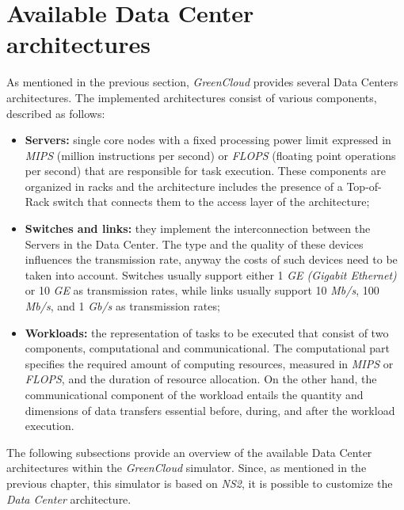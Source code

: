 \section{Available Data Center architectures} \label{chapter:architectures}
As mentioned in the previous section, \emph{GreenCloud} provides several Data Centers architectures. The implemented architectures consist of various components, described as follows:
\begin{itemize}
    \item \textbf{Servers:} single core nodes with a fixed processing power limit expressed in \emph{MIPS} (million instructions per second) or \emph{FLOPS} (floating point operations per second) that are responsible for task execution. These components are organized in racks and the architecture includes the presence of a Top-of-Rack switch that connects them to the access layer of the architecture;
    \item \textbf{Switches and links:} they implement the interconnection between the Servers in the Data Center. The type and the quality of these devices influences the transmission rate, anyway the costs of such devices need to be taken into account. Switches usually support either 1 \emph{GE (Gigabit Ethernet)} or 10 \emph{GE} as transmission rates, while links usually support 10 \emph{Mb/s}, 100 \emph{Mb/s}, and 1 \emph{Gb/s} as transmission rates;
    \item \textbf{Workloads:} the representation of tasks to be executed that consist of two components, computational and communicational. The computational part specifies the required amount of computing resources, measured in \emph{MIPS} or \emph{FLOPS}, and the duration of resource allocation. On the other hand, the communicational component of the workload entails the quantity and dimensions of data transfers essential before, during, and after the workload execution.
\end{itemize}
The following subsections provide an overview of the available Data Center architectures within the \emph{GreenCloud} simulator. Since, as mentioned in the previous chapter, this simulator is based on \emph{NS2}, it is possible to customize the \emph{Data Center} architecture. 

